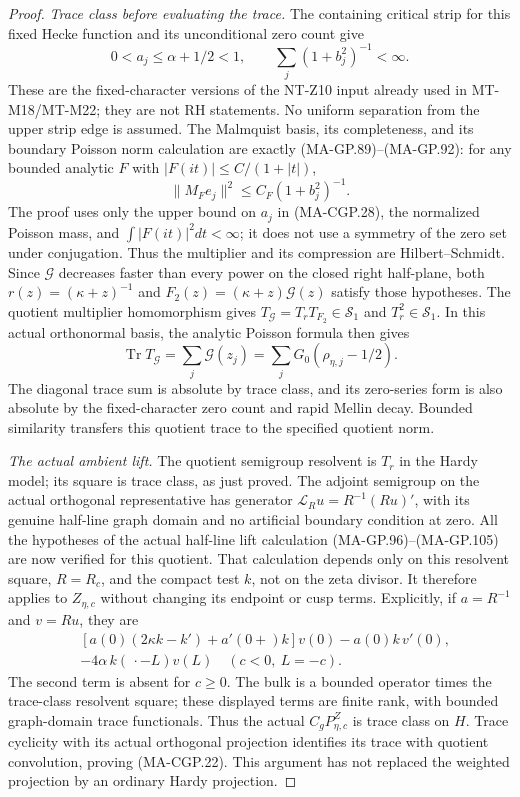 \begin{proof}
\emph{Trace class before evaluating the trace.}
The containing critical strip for this fixed Hecke function
and its unconditional zero count give
\[
       0<a_j\le\alpha+1/2<1,
                  \qquad\sum_j(1+b_j^2)^{-1}<\infty.
 \tag{MA-CGP.28}
\]
These are the fixed-character versions of the NT-Z10 input
already used in MT-M18/MT-M22; they are not RH statements.
No uniform separation from the upper strip edge is assumed.
The Malmquist basis, its completeness, and its boundary
Poisson norm calculation are exactly (MA-GP.89)--(MA-GP.92):
for any bounded analytic $F$ with
$|F(it)|\le C/(1+|t|)$,
\[
                  \|M_Fe_j\|^2\le C_F(1+b_j^2)^{-1}.
 \tag{MA-CGP.29}
\]
The proof uses only the upper bound on $a_j$ in (MA-CGP.28),
the normalized Poisson mass, and $\int|F(it)|^2dt<\infty$;
it does not use a symmetry of the zero set under conjugation.
Thus the multiplier and its compression are Hilbert--Schmidt.
Since $\mathcal G$ decreases faster than every power on the
closed right half-plane, both
$r(z)=(\kappa+z)^{-1}$ and
$F_2(z)=(\kappa+z)\mathcal G(z)$ satisfy those hypotheses.
The quotient multiplier homomorphism gives
$T_{\mathcal G}=T_rT_{F_2}\in\mathcal S_1$ and
$T_r^2\in\mathcal S_1$.
In this actual orthonormal basis, the analytic Poisson formula
then gives
\[
                \operatorname{Tr}T_{\mathcal G}
                   =\sum_j\mathcal G(z_j)
                   =\sum_jG_0(\rho_{\eta,j}-1/2).
 \tag{MA-CGP.30}
\]
The diagonal trace sum is absolute by trace class, and its
zero-series form is also absolute by the fixed-character
zero count and rapid Mellin decay.
Bounded similarity transfers this quotient trace to the
specified quotient norm.

\emph{The actual ambient lift.}
The quotient semigroup resolvent is $T_r$ in the Hardy model;
its square is trace class, as just proved.
The adjoint semigroup on the actual orthogonal representative
has generator
$\mathcal L_Ru=R^{-1}(Ru)'$, with its genuine half-line
graph domain and no artificial boundary condition at zero.
All the hypotheses of the actual half-line lift calculation
(MA-GP.96)--(MA-GP.105) are now verified for this quotient.
That calculation depends only on this resolvent square,
$R=R_c$, and the compact test $k$, not on the zeta divisor.
It therefore applies to $Z_{\eta,c}$ without changing its
endpoint or cusp terms.
Explicitly, if $a=R^{-1}$ and $v=Ru$, they are
\[
 \begin{aligned}
 &[a(0)(2\kappa k-k')+a'(0+)k]v(0)-a(0)k\,v'(0),\\
 &-4\alpha\,k(\,\cdot-L)v(L)\quad(c<0,\ L=-c).
 \end{aligned}
 \tag{MA-CGP.31}
\]
The second term is absent for $c\ge0$.
The bulk is a bounded operator times the trace-class
resolvent square; these displayed terms are finite rank,
with bounded graph-domain trace functionals.
Thus the actual $C_gP_{\eta,c}^Z$ is trace class on $H$.
Trace cyclicity with its actual orthogonal projection
identifies its trace with quotient convolution, proving
(MA-CGP.22).  This argument has not replaced the weighted
projection by an ordinary Hardy projection.


\end{proof}
